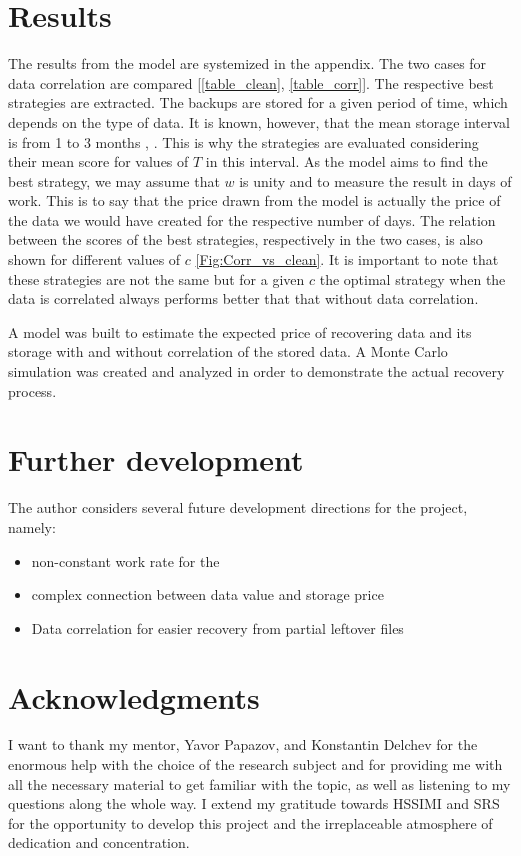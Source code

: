 \documentclass[11pt, a4paper]{article}
\theoremstyle{definition}
\begin{document}
\section{Results}
	The results from the model are systemized in the appendix. The two cases for data correlation are compared [\ref{table_clean}, \ref{table_corr}]. The respective best strategies are extracted. The backups are stored for a given period of time, which depends on the type of data. It is known, however, that the mean storage interval is from 1 to 3 months \cite{Gloukhovtsev}, \cite{Schepers}. This is why the strategies are evaluated considering their mean score for values of $T$ in this interval. As the model aims to find the best strategy, we may assume that $w$ is unity and to measure the result in days of work. This is to say that the price drawn from the model is actually the price of the data we would have created for the respective number of days. The relation between the scores of the best strategies, respectively in the two cases, is also shown for different values of $c$ \ref{Fig:Corr_vs_clean}. It is important to note that these strategies are not the same but for a given $c$ the optimal strategy when the data is correlated always performs better that that without data correlation.\par 
	A model was built to estimate the expected price of recovering data and its storage with and without correlation of the stored data. A Monte Carlo simulation was created and analyzed in order to demonstrate the actual recovery process.
\section{Further development}
	The author considers several future development directions for the project, namely:
	\begin{itemize}
		\item non-constant work rate for the 
		\item complex connection between data value and storage price
		\item Data correlation for easier recovery from partial leftover files
	\end{itemize}
\section{Acknowledgments}
I want to thank my mentor, Yavor Papazov, and Konstantin Delchev for the enormous help with the choice of the research subject and for providing me with all the necessary material to get familiar with the topic, as well as listening to my questions along the whole way. I extend my gratitude towards HSSIMI and SRS for the opportunity to develop this project and the irreplaceable atmosphere of dedication and concentration.
\newpage


\end{document}
